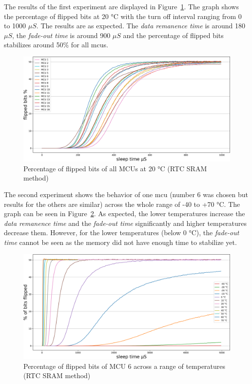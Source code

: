 The results of the first experiment are displayed in Figure~\ref{fig:all_plus_20_rtc}. The graph shows the percentage of flipped bits at 20 °C with the turn off interval ranging from 0 to 1000 $\mu{}S$. The results are as expected. The \emph{data remanence time} is around 180 $\mu{}S$, the \emph{fade-out time} is around 900 $\mu{}S$ and the percentage of flipped bits stabilizes around 50\% for all \glspl{mcu}.

\begin{figure}[ht!]
    \centering
    \captionsetup{justification=centering,margin=0.5cm}
    \includegraphics[width=\textwidth]{images/all_plus_20_rtc.png}
    \caption{Percentage of flipped bits of all MCUs at 20 °C (RTC SRAM method)}
    \label{fig:all_plus_20_rtc}
\end{figure}


The second experiment shows the behavior of one \gls{mcu} (number 6 was chosen but results for the others are similar) across the whole range of -40 to +70 °C. The graph can be seen in Figure~\ref{fig:6_across_temps_rtc}. As expected, the lower temperatures increase the \emph{data remanence time} and the \emph{fade-out time} significantly and higher temperatures decrease them. However, for the lower temperatures (below 0 °C), the \emph{fade-out time} cannot be seen as the memory did not have enough time to stabilize yet. 

\begin{figure}[ht!]
    \centering
    \captionsetup{justification=centering,margin=0.5cm}
    \includegraphics[width=\textwidth]{images/6_across_temps_rtc.png}
    \caption{Percentage of flipped bits of MCU 6 across a range of temperatures (RTC SRAM method)}
    \label{fig:6_across_temps_rtc}
\end{figure}

